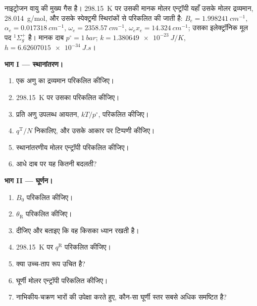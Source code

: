 \begin{problem}
\label{pb:b3:partition-functions:1}
नाइट्रोजन वायु की मुख्य गैस है। \qty{298.15}{K} पर उसकी मानक मोलर एन्ट्रॉपी
यहाँ उसके मोलर द्रव्यमान, \qty{28.014}{g/mol}, और उसके
स्पेक्ट्रमी स्थिरांकों से परिकलित की जाती है: $B_e = \qty{1.998241}{cm^{-1}}$, $\alpha_e = \qty{0.017318}{cm^{-1}}$, $\omega_e =
\qty{2358.57}{cm^{-1}}$, $\omega_ex_e = \qty{14.324}{cm^{-1}}$; उसका इलेक्ट्रॉनिक मूल पद ${}^1\Sigma_g^+$ है।
मानक दाब $p^\circ = \qty{1}{bar}$; $k = \qty{1.380649e-23}{J/K}$, $h = \qty{6.62607015e-34}{J.s}$।

\medskip\noindent\textbf{भाग I --- स्थानांतरण।}
\begin{enumerate}
  \item एक अणु का द्रव्यमान परिकलित कीजिए।
  \item \qty{298.15}{K} पर उसका  परिकलित कीजिए।
  \item प्रति अणु उपलब्ध आयतन, $kT/p^\circ$, परिकलित कीजिए।
  \item $q^{\mathrm T}/N$ निकालिए, और उसके आकार पर टिप्पणी कीजिए।
  \item स्थानांतरणीय मोलर एन्ट्रॉपी परिकलित कीजिए।
  \item आधे दाब पर यह कितनी बदलती?
\end{enumerate}

\medskip\noindent\textbf{भाग II --- घूर्णन।}
\begin{enumerate}[resume]
  \item $B_0$ परिकलित कीजिए।
  \item $\theta_{\mathrm R}$ परिकलित कीजिए।
  \item {} दीजिए और बताइए कि वह किसका ध्यान रखती है।
  \item \qty{298.15}{K} पर $q^{\mathrm R}$ परिकलित कीजिए।
  \item क्या उच्च-ताप रूप उचित है?
  \item घूर्णी मोलर एन्ट्रॉपी परिकलित कीजिए।
  \item नाभिकीय-चक्रण भारों की उपेक्षा करते हुए, कौन-सा घूर्णी स्तर सबसे अधिक
        समष्टित है?
\end{enumerate}


\end{problem}
